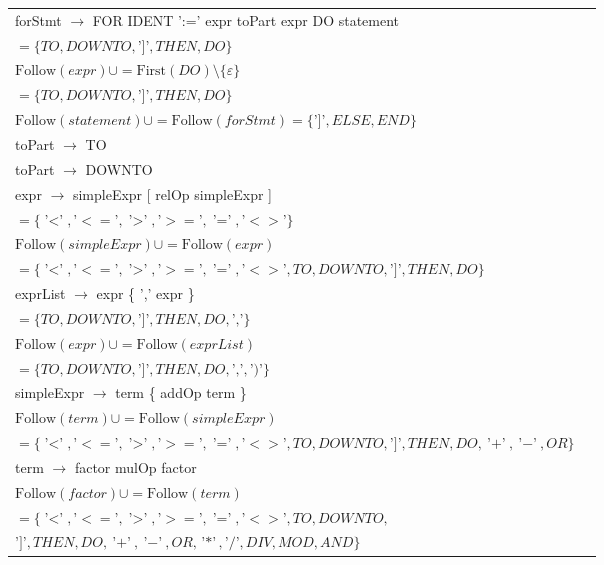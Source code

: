 \documentclass[8pt]{scrartcl}
\newcommand{\First}[1]{\mathrm{First}(#1)}
\newcommand{\Follow}[1]{\mathrm{Follow}(#1)}
\newcommand{\epsset}{\{\varepsilon\}}
\begin{document}
\begin{itemize}
\begin{tabular}{|l|l|}
                    forStmt $\rightarrow$ FOR IDENT ':=' expr toPart expr DO statement & \makecell[l]{$\Follow{expr} \cup = \First{toPart} \setminus \epsset $\\ $= \{TO, DOWNTO, \text{']'}, THEN, DO\}$\\$\Follow{expr} \cup = \First{DO} \setminus \epsset $\\ $= \{TO, DOWNTO, \text{']'}, THEN, DO\}$\\ $\Follow{statement} \cup = \Follow{forStmt} = \{\text{'$]$'}, ELSE, END\}$}\\
                    \hline
                    toPart $\rightarrow$ TO & \\
                    \hline
                    toPart $\rightarrow$ DOWNTO & \\
                    \hline
                    expr $\rightarrow$ simpleExpr [ relOp simpleExpr ] & \makecell[l]{$\Follow{simpleExpr} \cup = \First{relOp} \setminus \epsset $\\ $= \{\text{'$<$'}, \text{'$<=$'}, \text{'$>$'}, \text{'$>=$'}, \text{'$=$'}, \text{'$<>$'}\}$\\ $\Follow{simpleExpr} \cup = \Follow{expr} $\\ $= \{\text{'$<$'}, \text{'$<=$'}, \text{'$>$'}, \text{'$>=$'}, \text{'$=$'}, \text{'$<>$'}, TO, DOWNTO, \text{'$]$'}, THEN, DO\}$}\\
                    \hline
                    exprList $\rightarrow$ expr \{ ',' expr \} & \makecell[l]{$\Follow{expr} \cup = \First{\text{','}} \setminus \epsset $\\ $= \{TO, DOWNTO, \text{']'}, THEN, DO, \text{','}\}$\\ $\Follow{expr} \cup = \Follow{exprList} $\\ $= \{TO, DOWNTO, \text{']'}, THEN, DO, \text{','}, \text{'$)$'}\}$}\\
                    \hline
                    simpleExpr $\rightarrow$ term \{ addOp term \} & \makecell[l]{$\Follow{term} \cup = \First{addOp} \setminus \epsset = \{\text{'$+$'}, \text{'$-$'}, OR\}$\\ $\Follow{term} \cup = \Follow{simpleExpr} $\\ $= \{\text{'$<$'}, \text{'$<=$'}, \text{'$>$'}, \text{'$>=$'}, \text{'$=$'}, \text{'$<>$'}, TO, DOWNTO, \text{'$]$'}, THEN, DO, \text{'$+$'}, \text{'$-$'}, OR\}$}\\
                    \hline
                    term $\rightarrow$ factor { mulOp factor } & \makecell[l]{$\Follow{factor} \cup = \First{mulOp} \setminus \epsset = \{\text{'$*$'}, \text{'$/$'}, DIV, MOD, AND\}$\\$\Follow{factor} \cup = \Follow{term} $\\ $= \{\text{'$<$'}, \text{'$<=$'}, \text{'$>$'}, \text{'$>=$'}, \text{'$=$'}, \text{'$<>$'}, TO, DOWNTO,$\\$ \text{'$]$'}, THEN, DO, \text{'$+$'}, \text{'$-$'}, OR, \text{'$*$'}, \text{'$/$'}, DIV, MOD, AND\}$}\\

\end{tabular}
\end{itemize}
\end{document}
